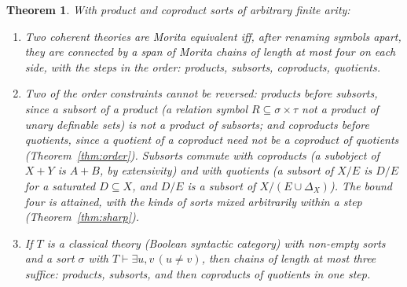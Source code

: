 \documentclass[11pt]{amsart}
\newtheorem{thm}{Theorem}[section]
\theoremstyle{definition}
\begin{document}
\begin{thm}\label{thm:length}
With product and coproduct sorts of arbitrary finite arity:
\begin{enumerate}
\item[(i)] Two coherent theories are Morita equivalent iff, after
renaming symbols apart, they are connected by a span of Morita chains
of length at most four on each side, with the steps in the order:
products, subsorts, coproducts, quotients.
\item[(ii)] Two of the order constraints cannot be reversed: products
before subsorts, since a subsort of a product (a relation symbol
$R\subseteq\sigma\times\tau$ not a product of unary definable sets) is
not a product of subsorts; and coproducts before quotients, since a
quotient of a coproduct need not be a coproduct of quotients
(Theorem~\ref{thm:order}). Subsorts commute with coproducts (a
subobject of $X+Y$ is $A+B$, by extensivity) and with quotients (a
subsort of $X/E$ is $D/E$ for a saturated $D\subseteq X$, and $D/E$ is a
subsort of $X/(E\cup\Delta_X)$). The bound four is attained, with the
kinds of sorts mixed arbitrarily within a step (Theorem~\ref{thm:sharp}).
\item[(iii)] If $T$ is a classical theory (Boolean syntactic category)
with non-empty sorts and a sort $\sigma$ with $T\vdash\exists u,v\,(u\ne
v)$, then chains of length at most three suffice: products, subsorts,
and then coproducts of quotients in one step.
\end{enumerate}
\end{thm}
\end{document}
